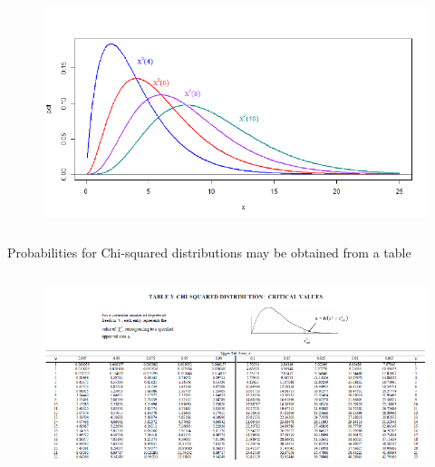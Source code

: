 \documentclass[smaller]{beamer}\usepackage[]{graphicx}\usepackage[]{color}
\begin{document}
\begin{frame}{\subsecname}

\begin{figure}[ptb]\centering
\includegraphics[height=2.6143in, width=4.6643in]{img/chisquared_pdfs__2.pdf}%
\end{figure}

Probabilities for Chi-squared distributions may be obtained from a table

\end{frame}%

\begin{frame}{\subsecname}



\begin{figure}[ptb]\centering
\includegraphics[height=2.2649in, width=4.9658in]{img/chisq_table__3.pdf}%
\end{figure}

\end{frame}%
\end{document}
